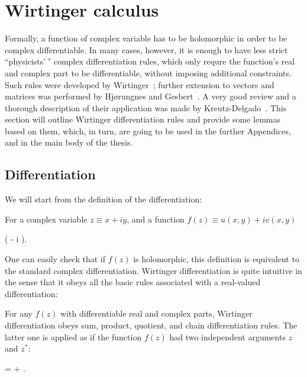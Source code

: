 \chapter{Wirtinger calculus}
\label{cha:appendix:c-numbers}

Formally, a function of complex variable has to be holomorphic in order to be complex differentiable.
In many cases, however, it is enough to have less strict ``physicists'\,'' complex differentiation rules, which only requre the function's real and complex part to be differentiable, without imposing additional constraints.
Such rules were developed by Wirtinger~\cite{Wirtinger1927}; further extension to vectors and matrices was performed by Hj{\o}rungnes and Gesbert~\cite{Hjorungnes2007}.
A very good review and a thorough description of their application was made by Kreutz-Delgado~\cite{Kreutz-Delgado2009}.
This section will outline Wirtinger differentiation rules and provide some lemmas based on them, which, in turn, are going to be used in the further Appendices, and in the main body of the thesis.


\section{Differentiation}

We will start from the definition of the differentiation:

\begin{definition}
\label{def:c-numbers:wirtinger}
	For a complex variable $z \equiv x + iy$, and a function $f(z) \equiv u(x, y) + iv(x, y)$
	\begin{eqn*}
		\equiv {} \left(
			 - i 
		\right).
	\end{eqn*}
\end{definition}

One can easily check that if $f(z)$ is holomorphic, this definition is equivalent to the standard complex differentiation.
Wirtinger differentiation is quite intuitive in the sense that it obeys all the basic rules associated with a real-valued differentiation:

\begin{theorem}
\label{thm:c-numbers:diff-properties}
	For any $f(z)$ with differentiable real and complex parts, Wirtinger differentiation obeys sum, product, quotient, and chain differentiation rules.
	The latter one is applied as if the function $f(z)$ had two independent arguments $z$ and $z^*$:
	\begin{eqn*}
		\frac{\cwd f(g(z))}{\cwd z}
		=  \frac{\cwd g}{\cwd z}
			+  \frac{\cwd g^*}{\cwd z}.
	\end{eqn*}
\end{theorem}

